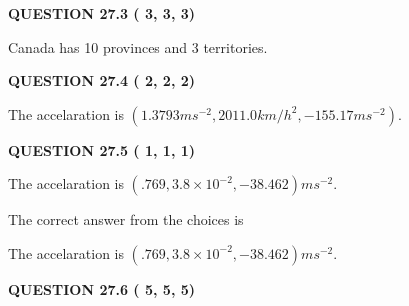 \documentclass[12pt]{article}
\begin{document}
  
 
 
 
 
  
\vspace{0.2in}
  
{\textbf{\Large{QUESTION
27.3 
 (          3,          3,          3)
}}}
  
  
 
 
\noindent{}
 
 
Canada has  %
10 provinces and  %
3 territories.
 
 
 
 
  
\vspace{0.2in}
  
{\textbf{\Large{QUESTION
27.4 
 (          2,          2,          2)
}}}
  
  
 
 
\noindent{}
 
 
The accelaration is
$(
1.3793ms^{-2},
2011.0km/h^2,
-155.17ms^{-2}
).
$
 
 
 
 
  
\vspace{0.2in}
  
{\textbf{\Large{QUESTION
27.5 
 (          1,          1,          1)
}}}
  
  


 
 
\noindent{}
 
 
The accelaration is $  %
(
.769,
3.8 \times 10^{-2},
-38.462)
ms^{-2} $.
 
 
 
 
 
 
\noindent{}

The correct answer from the choices is


The accelaration is $  %
(
.769,
3.8 \times 10^{-2},
-38.462)
ms^{-2} $.
 
 
 
  
\vspace{0.2in}
  
{\textbf{\Large{QUESTION
27.6 
 (          5,          5,          5)
}}}
  
\end{document}
